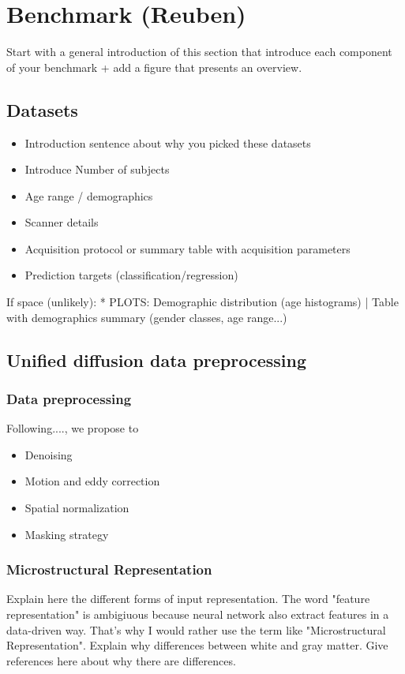 \section{Benchmark (Reuben)}
Start with a general introduction of this section that introduce each component of your benchmark + add a figure that presents an overview.

\subsection{Datasets}
\begin{itemize}
    \item Introduction sentence about why you picked these datasets
    \item Introduce Number of subjects
    \item Age range / demographics
    \item Scanner details
    \item Acquisition protocol or summary table with acquisition parameters
    \item Prediction targets (classification/regression)
\end{itemize}
If space (unlikely):
* PLOTS: Demographic distribution (age histograms) | Table with demographics summary (gender classes, age range...)

\subsection{Unified diffusion data preprocessing}
\subsubsection{Data preprocessing}
Following...., we propose to
\begin{itemize}
    \item Denoising
    \item Motion and eddy correction
    \item Spatial normalization
    \item Masking strategy
\end{itemize}

\subsubsection{Microstructural Representation}
Explain here the different forms of input representation.
The word "feature representation" is ambigiuous because neural network also extract features in a data-driven way. That's why I would rather use the term like "Microstructural Representation".
Explain why differences between white and gray matter. Give references here about why there are differences.

